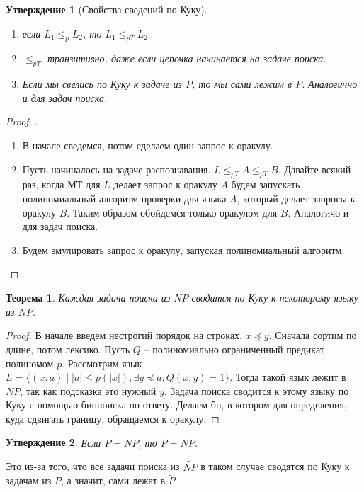 \documentclass[12pt, letterpaper]{article}
\newtheorem{theorem}{Теорема}[section]
\newtheorem{prop}{Утверждение}[section]
\newcommand{\leqp}{\leq_{p}}
\begin{document}
\begin{prop}[Свойства сведений по Куку].
\begin{enumerate} 
\item если $L_1 \leqp L_2$, то $L_1 \leq_{pT} L_2$
\item $\leq_{pT}$ транзитивно, даже если цепочка начинается на задаче поиска.
\item Если мы свелись по Куку к задаче из $P$, то мы сами лежим в $P$. Аналогично и для задач поиска.
\end{enumerate}
\end{prop}

\begin{proof}.
\begin{enumerate}
\item В начале сведемся, потом сделаем один запрос к оракулу. 
\item Пусть начиналось на задаче распознавания. $L \leq_{pT} A \leq_{pT} B$. Давайте всякий раз, когда МТ для $L$ делает запрос к оракулу $A$ будем запускать полиномиальный алгоритм проверки для языка $A$, который делает запросы к оракулу $B$. Таким образом обойдемся только оракулом для $B$. Аналогичо и для задач поиска.
\item Будем эмулировать запрос к оракулу, запуская полиномиальный алгоритм.
\end{enumerate}
\end{proof}

\begin{theorem}
Каждая задача поиска из $\widetilde{NP}$ сводится по Куку к некоторому языку из $NP$.
\end{theorem}
\begin{proof}
В начале введем нестрогий порядок на строках. $x \preceq y$. Сначала сортим по длине, потом лексико. Пусть $Q$ -- полиномиально ограниченный предикат полиномом $p$. Рассмотрим язык $L =
\{ (x,a)\;|\;|a|\leq p(|x|), \exists y \preceq a : Q(x, y) = 1 \}$. Тогда такой язык лежит в $NP$, так как подсказка это нужный $y$. Задача поиска сводится к этому языку по Куку с помощью бинпоиска по ответу. Делаем бп, в котором для определения, куда сдвигать границу, обращаемся к оракулу.
\end{proof}

\begin{prop}
Если $P=NP$, то $\widetilde{P} = \widetilde{NP}$.
\end{prop}
Это из-за того, что все задачи поиска из $\widetilde{NP}$ в таком случае сводятся по Куку к задачам из $P$, а значит, сами лежат в $\widetilde{P}$.
\end{document}
